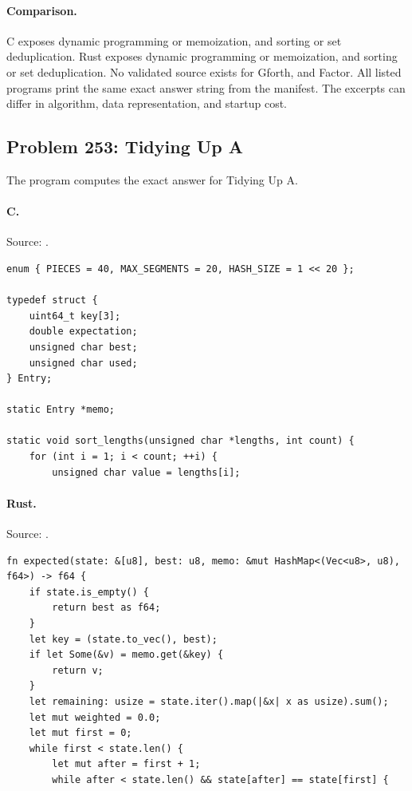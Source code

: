 \paragraph{Comparison.}
C exposes dynamic programming or memoization, and sorting or set deduplication. Rust exposes dynamic programming or memoization, and sorting or set deduplication.
No validated source exists for Gforth, and Factor.
All listed programs print the same exact answer string from the manifest. The excerpts can differ in algorithm, data representation, and startup cost.

\subsection{Problem 253: Tidying Up A}
\label{walkthrough:p253}
The program computes the exact answer for Tidying Up A.

\paragraph{C.} Source: .
\begin{lstlisting}
enum { PIECES = 40, MAX_SEGMENTS = 20, HASH_SIZE = 1 << 20 };

typedef struct {
    uint64_t key[3];
    double expectation;
    unsigned char best;
    unsigned char used;
} Entry;

static Entry *memo;

static void sort_lengths(unsigned char *lengths, int count) {
    for (int i = 1; i < count; ++i) {
        unsigned char value = lengths[i];
\end{lstlisting}

\paragraph{Rust.} Source: .
\begin{lstlisting}
fn expected(state: &[u8], best: u8, memo: &mut HashMap<(Vec<u8>, u8), f64>) -> f64 {
    if state.is_empty() {
        return best as f64;
    }
    let key = (state.to_vec(), best);
    if let Some(&v) = memo.get(&key) {
        return v;
    }
    let remaining: usize = state.iter().map(|&x| x as usize).sum();
    let mut weighted = 0.0;
    let mut first = 0;
    while first < state.len() {
        let mut after = first + 1;
        while after < state.len() && state[after] == state[first] {
\end{lstlisting}

